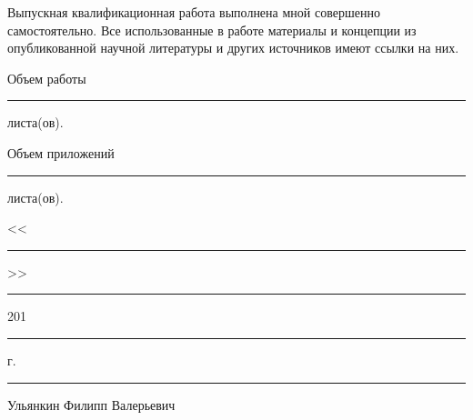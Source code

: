 \documentclass[14pt,a4paper, oneside]{extreport}
\theoremstyle{plain}              %
\theoremstyle{definition}         %
\begin{document}
\newpage
Выпускная квалификационная работа выполнена мной совершенно самостоятельно. Все использованные в работе материалы и концепции из опубликованной научной литературы и других источников имеют ссылки на них.

\vspace{2ex}

\noindent Объем работы  \rule{3em}{0.5pt} листа(ов).

\vspace{2ex}

\noindent Объем приложений \rule{3em}{0.5pt} листа(ов).

\vspace{4ex}

\noindent <<\rule{2em}{0.5pt}>> \rule{5em}{0.5pt} 201\rule{1em}{0.5pt} г. 

\vspace{4ex}

\noindent \rule{10em}{0.5pt} Ульянкин Филипп Валерьевич
\end{document}
